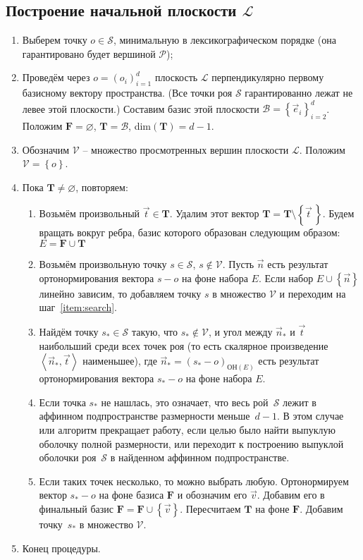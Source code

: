 \documentclass[a4paper,12pt]{article}
\newcommand{\Swarm}{\mathcal{S}}              %
\newcommand{\Polyhedron}{\mathcal{P}}         %
\newcommand{\Basis}{\mathcal{B}}              %
\newcommand{\Viewed}{\mathcal{V}}             %
\newcommand{\origin}{o}                       %
\newcommand{\set}[1]{\left\{ #1 \right\}}                    %
\newcommand{\scalprod}[2]{\left\langle #1, #2 \right\rangle} %
\newcommand{\TempVec}{\mathbf{T}}  %
\newcommand{\FinalVec}{\mathbf{F}} %
\newcommand{\Plane}{\mathcal{L}}           %
\begin{document}
  \subsection{Построение начальной плоскости $\Plane$}
    \begin{enumerate}
      \item Выберем точку $\origin \in \Swarm$, минимальную в лексикографическом порядке (она гарантировано будет вершиной $\Polyhedron$);

      \item Проведём через $\origin=(o_i)_{i = 1}^{d}$ плоскость $\Plane$ перпендикулярно первому базисному вектору пространства. (Все точки роя $\Swarm$ гарантированно лежат не левее этой плоскости.) Составим базис этой плоскости $\Basis = \set{\vec e_i}_{i=2}^d$. Положим $\FinalVec = \varnothing$, $\TempVec = \Basis$, dim$(\TempVec) = d-1$.
      \item Обозначим $\Viewed$ -- множество просмотренных вершин плоскости $\Plane$. Положим $\Viewed =\set{o}$.
      \item Пока $\TempVec \neq \varnothing$, повторяем:
      \begin{enumerate}
        \item Возьмём произвольный $\vec t \in \TempVec$. Удалим этот вектор $\TempVec = \TempVec \setminus \set{\vec t \,}$. Будем вращать вокруг ребра, базис которого образован следующим образом: $E = \FinalVec \cup \TempVec$
        \item Возьмём произвольную точку $s \in \Swarm$, $s \notin \Viewed$. Пусть $\vec n$ есть результат ортонормирования вектора $s - o$ на фоне набора $E$. Если набор $E \cup \set{\vec n}$ линейно зависим, то добавляем точку $s$ в множество $\Viewed$ и переходим на шаг~\ref{item:search}.
        \label{item:search}
        \item Найдём точку $s_* \in \Swarm$ такую, что $s_* \notin \Viewed$, и угол между $\vec n_*$ и $\vec t$ наибольший среди всех точек роя (то есть скалярное произведение $\scalprod{\vec n_*}{\vec t}$ наименьшее), где $\vec n_* = (s_* - o)_{\text{ОН}(E)}$ есть результат ортонормирования вектора $s_* - o$ на фоне набора $E$.
        \item Если точка $s_*$ не нашлась, это означает, что весь рой~$\Swarm$ лежит в аффинном подпространстве размерности меньше~$d-1$. В этом случае или алгоритм прекращает работу, если целью было найти выпуклую оболочку полной размерности, или переходит к построению выпуклой оболочки роя~$\Swarm$ в найденном аффинном подпространстве.
        \item  Если таких точек несколько, то можно выбрать любую. Ортонормируем вектор $s_* - o$ на фоне базиса $\FinalVec$ и обозначим его $\vec v$. Добавим его в финальный базис $\FinalVec = \FinalVec \cup \set{\vec v}$. Пересчитаем $\TempVec$ на фоне $\FinalVec$.
        Добавим точку~$s_*$ в множество $\Viewed$.
      \end{enumerate}
      \item Конец процедуры.
    \end{enumerate}
\end{document}

